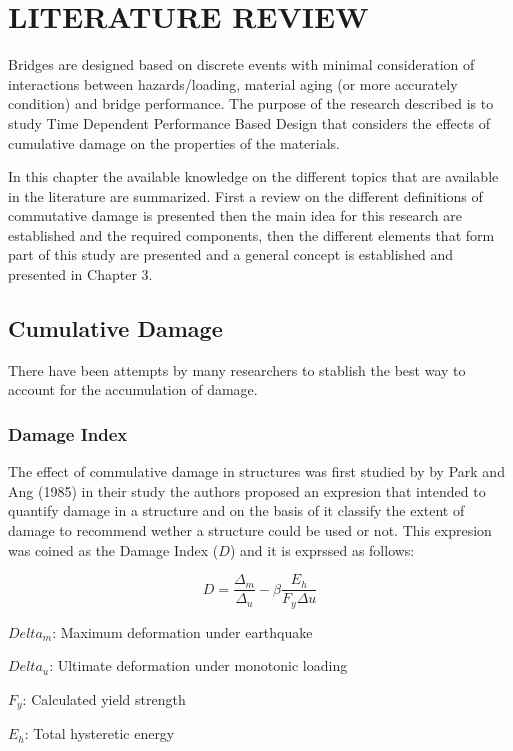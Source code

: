 \chapter{LITERATURE REVIEW}
\label{chap-two}
Bridges are designed based on discrete events with minimal consideration of interactions between hazards/loading, material aging (or more accurately condition) and bridge performance. The purpose of the research described is to study Time Dependent Performance Based Design that considers the effects of cumulative damage on the properties of the materials.

In this chapter the available knowledge on the different topics that are available in the literature are summarized. First a review on the different definitions of commutative damage is presented then the main idea for this research are established and the required components, then the different elements that form part of this study are presented and  a general concept is established and presented in Chapter 3.

\section{Cumulative Damage}

There have been attempts by many researchers to stablish the best way to account for the accumulation of damage. 

\subsection{Damage Index}
The effect of commulative damage in structures was first studied by by Park and Ang (1985) \cite{Young-JiPark1985} in their study the authors proposed an expresion that intended to quantify damage in a structure and on the basis of it classify the extent of damage to recommend wether a structure could be used or not. This expresion was coined as the Damage Index ($D$) and it is exprssed as follows:

\begin{equation}
  D=\frac{\Delta_{m}}{\Delta_{u}}-\beta \frac{E_h}{F_{y}\Delta{u}}
  \label{eq.DamageIndex}
\end{equation} 

$Delta_{m}$: Maximum deformation under earthquake

$Delta_{u}$: Ultimate deformation under monotonic loading

$F_{y}$: Calculated yield strength

$E_{h}$: Total hysteretic energy

